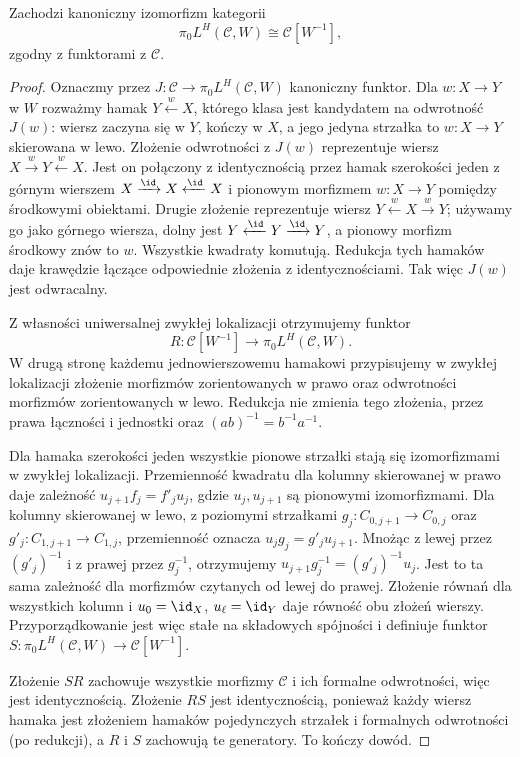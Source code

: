 \begin{twierdzenie}\label{cat:thm:dk-hammock-pi0}
Zachodzi kanoniczny izomorfizm kategorii
\[
 \pi_0L^H(\mathcal C,W)\cong\mathcal C[W^{-1}],
\]
zgodny z funktorami z $\mathcal C$.
\end{twierdzenie}
\begin{proof}
Oznaczmy przez $J:\mathcal C\to\pi_0L^H(\mathcal C,W)$ kanoniczny funktor. Dla $w:X\to Y$ w $W$ rozważmy hamak $Y\xleftarrow{w}X$, którego klasa jest kandydatem na odwrotność $J(w)$: wiersz zaczyna się w $Y$, kończy w $X$, a jego jedyna strzałka to $w:X\to Y$ skierowana w lewo. Złożenie odwrotności z $J(w)$ reprezentuje wiersz $X\xrightarrow{w}Y\xleftarrow{w}X$. Jest on połączony z identycznością przez hamak szerokości jeden z górnym wierszem $X\xrightarrow{\id}X\xleftarrow{\id}X$ i pionowym morfizmem $w:X\to Y$ pomiędzy środkowymi obiektami. Drugie złożenie reprezentuje wiersz $Y\xleftarrow{w}X\xrightarrow{w}Y$; używamy go jako górnego wiersza, dolny jest $Y\xleftarrow{\id}Y\xrightarrow{\id}Y$, a pionowy morfizm środkowy znów to $w$. Wszystkie kwadraty komutują. Redukcja tych hamaków daje krawędzie łączące odpowiednie złożenia z identycznościami. Tak więc $J(w)$ jest odwracalny.

Z własności uniwersalnej zwykłej lokalizacji otrzymujemy funktor
\[
 R:\mathcal C[W^{-1}]\longrightarrow\pi_0L^H(\mathcal C,W).
\]
W drugą stronę każdemu jednowierszowemu hamakowi przypisujemy w zwykłej lokalizacji złożenie morfizmów zorientowanych w prawo oraz odwrotności morfizmów zorientowanych w lewo. Redukcja nie zmienia tego złożenia, przez prawa łączności i jednostki oraz $(ab)^{-1}=b^{-1}a^{-1}$.

Dla hamaka szerokości jeden wszystkie pionowe strzałki stają się izomorfizmami w zwykłej lokalizacji. Przemienność kwadratu dla kolumny skierowanej w prawo daje zależność $u_{j+1}f_j=f'_ju_j$, gdzie $u_j,u_{j+1}$ są pionowymi izomorfizmami. Dla kolumny skierowanej w lewo, z poziomymi strzałkami $g_j:C_{0,j+1}\to C_{0,j}$ oraz $g'_j:C_{1,j+1}\to C_{1,j}$, przemienność oznacza $u_j g_j=g'_j u_{j+1}$. Mnożąc z lewej przez $(g'_j)^{-1}$ i z prawej przez $g_j^{-1}$, otrzymujemy $u_{j+1}g_j^{-1}=(g'_j)^{-1}u_j$. Jest to ta sama zależność dla morfizmów czytanych od lewej do prawej. Złożenie równań dla wszystkich kolumn i $u_0=\id_X$, $u_\ell=\id_Y$ daje równość obu złożeń wierszy. Przyporządkowanie jest więc stałe na składowych spójności i definiuje funktor $S:\pi_0L^H(\mathcal C,W)\to\mathcal C[W^{-1}]$.

Złożenie $SR$ zachowuje wszystkie morfizmy $\mathcal C$ i ich formalne odwrotności, więc jest identycznością. Złożenie $RS$ jest identycznością, ponieważ każdy wiersz hamaka jest złożeniem hamaków pojedynczych strzałek i formalnych odwrotności (po redukcji), a $R$ i $S$ zachowują te generatory. To kończy dowód.
\end{proof}

